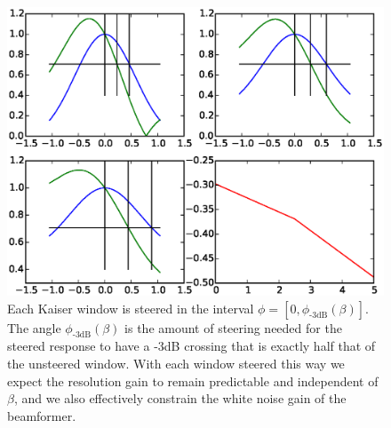 \documentclass[10pt,journal,draftclsnofoot,onecolumn]{IEEEtran}
\let\MYoriglatexcaption\caption               %
\renewcommand{\caption}[2][\relax]{\MYoriglatexcaption[#2]{#2}}
\newcommand\1{\vec 1}
\begin{document}
\begin{figure}[tbp]%
\includegraphics[width=.9\linewidth]{gfx/calc_kaiser_3dB.eps}%
\caption{Each Kaiser window is steered in the interval $\phi=[0, \phi_{\text{-3dB}}(\beta)]$. The angle $\phi_{\text{-3dB}}(\beta)$ is the amount of steering needed for the steered response to have a -3dB crossing that is exactly half that of the unsteered window. With each window steered this way we expect the resolution gain to remain predictable and independent of $\beta$, and we also effectively constrain the white noise gain of the beamformer.}\label{windows_steering}
\end{figure}

\setcounter{topnumber}{1}
\setcounter{dbltopnumber}{1}
\end{document}
